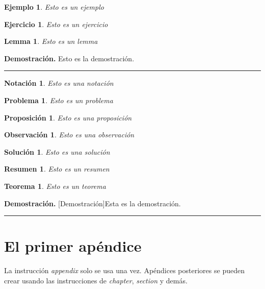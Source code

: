 \documentclass[11pt,spanish]{report}
\newtheorem{theorem}{Teorema}[section]
\newtheorem{example}{Ejemplo}[section]
\newtheorem{exercise}{Ejercicio}[section]
\newtheorem{lemma}{Lemma}[section]
\newtheorem{notation}{Notación}[section]
\newtheorem{problem}{Problema}[section]
\newtheorem{proposition}{Proposición}[section]
\newtheorem{remark}{Observación}[section]
\newtheorem{solution}{Solución}[section]
\newtheorem{summary}{Resumen}[section]
\newenvironment{proof}[1][Demostración]{\textbf{#1.} }{\ \rule{0.5em}{0.5em}}
\begin{document}
\begin{example}
Esto es un ejemplo
\end{example}

\begin{exercise}
Esto es un ejercicio
\end{exercise}

\begin{lemma}
Esto es un lemma
\end{lemma}

\begin{proof}
Esto es la demostración.
\end{proof}

\begin{notation}
Esto es una notación
\end{notation}

\begin{problem}
Esto es un problema
\end{problem}

\begin{proposition}
Esto es una proposición
\end{proposition}

\begin{remark}
Esto es una observación
\end{remark}

\begin{solution}
Esto es una solución
\end{solution}

\begin{summary}
Esto es un resumen
\end{summary}

\begin{theorem}
Esto es un teorema
\end{theorem}

\begin{proof}
[Demostración]Esta es la demostración.
\end{proof}

\appendix 

\chapter{El primer apéndice}

La instrucción \emph{appendix} solo se usa una vez. Apéndices posteriores se pueden crear usando las instrucciones de \emph{chapter}, \emph{section} y demás.



\end{document}
